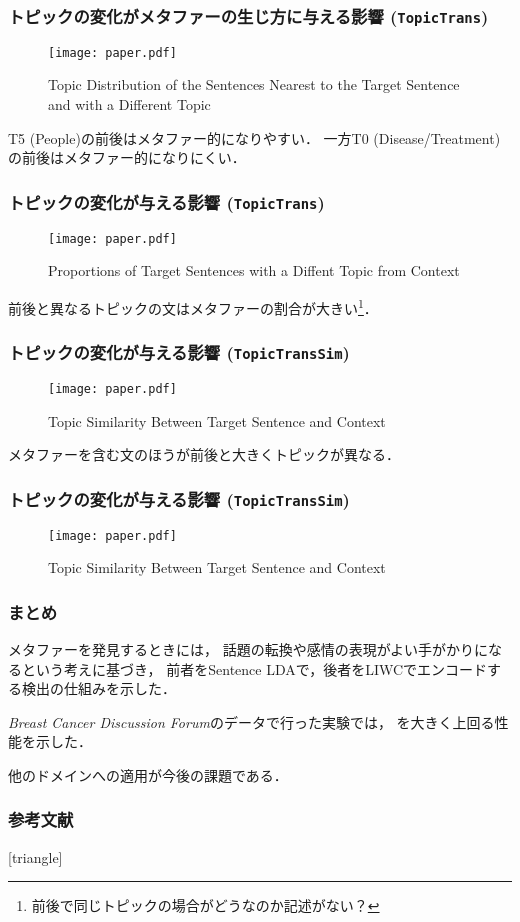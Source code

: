 \documentclass[11pt,usepdftitle=false]{beamer}
\newcommand\papertitle[1]{\textit{#1}}
\let\oldcite=\citet
\renewcommand\citet[1]{\hyperlink{#1}{\oldcite{#1}}}
\begin{document}
\begin{frame}
    \frametitle{トピックの変化がメタファーの生じ方に与える影響 (\texttt{TopicTrans})}
    \begin{figure}
        \centering
        \caption{Topic Distribution of the Sentences Nearest to the
            Target Sentence and with a Different Topic}
            \texttt{[image: paper.pdf]}
    \end{figure}

    T5 (People)の前後はメタファー的になりやすい．
    一方T0 (Disease/Treatment)の前後はメタファー的になりにくい．
\end{frame}

\begin{frame}
    \frametitle{トピックの変化が与える影響 (\texttt{TopicTrans})}
    \begin{figure}
        \centering
        \caption{Proportions of Target Sentences with a Diffent Topic from Context}
        \texttt{[image: paper.pdf]}
    \end{figure}

    前後と異なるトピックの文はメタファーの割合が大きい\footnote{前後で同じトピックの場合がどうなのか記述がない？}．
\end{frame}

\begin{frame}
    \frametitle{トピックの変化が与える影響 (\texttt{TopicTransSim})}
    \begin{figure}
        \centering
        \caption{Topic Similarity Between Target Sentence and Context}
        \texttt{[image: paper.pdf]}
    \end{figure}
    メタファーを含む文のほうが前後と大きくトピックが異なる．
\end{frame}

\begin{frame}
    \frametitle{トピックの変化が与える影響 (\texttt{TopicTransSim})}
    \begin{figure}
        \centering
        \caption{Topic Similarity Between Target Sentence and Context}
        \texttt{[image: paper.pdf]}
    \end{figure}
\end{frame}

\begin{frame}
    \frametitle{まとめ}
    メタファーを発見するときには，
    話題の転換や感情の表現がよい手がかりになるという考えに基づき，
    前者をSentence LDAで，後者をLIWCでエンコードする検出の仕組みを示した．

    \papertitle{Breast Cancer Discussion Forum}のデータで行った実験では，
    \citet{jang2015}を大きく上回る性能を示した．

    他のドメインへの適用が今後の課題である．
\end{frame}

\begin{frame}[allowframebreaks]
\frametitle{参考文献}
    \scriptsize
    [triangle]
    
    
\end{frame}
\end{document}
